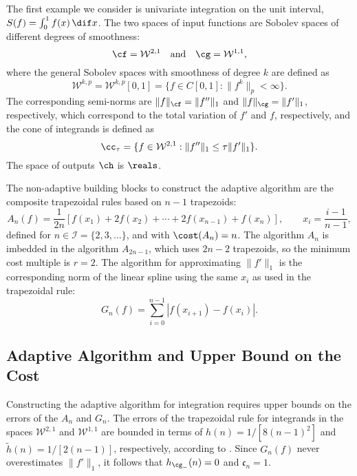 The first example we consider is univariate integration on the unit interval, $S(f)=\int_{0}^{1}f(x) \, \dif x$.  The two spaces of input functions are Sobolev spaces of different degrees of smoothness:
\begin{equation*}
  \cf=\mathcal{W}^{2,1} \quad \text{and} \quad
  \cg=\mathcal{W}^{1,1},
\end{equation*}
where the general Sobolev spaces with smoothness of degree $k$ are defined as 
\begin{equation} \label{defSobolev}
  \mathcal{W}^{k,p}=\mathcal{W}^{k,p}[0,1]=\{f\in C[0,1]: \|f^{k}\|_{p}<\infty\}.
\end{equation}
The corresponding semi-norms are $\|f\|_{\cf}=\|f''\|_{1}$ and $\|f\|_{\cg}=\|f'\|_{1}$, respectively, which correspond to the total variation of $f'$ and $f$, respectively,  and the cone of integrands is defined as  
\begin{equation}\label{coneinteg}
\cc_{\tau}=\{f\in \mathcal{W}^{2,1}:\|f''\|_1\leq\tau\|f'\|_1\}.
\end{equation}
The space of outputs $\ch$ is $\reals$.

The non-adaptive building blocks to construct the adaptive algorithm are the composite trapezoidal rules based on $n-1$ trapezoids:
\begin{equation*}
    A_{n}(f)
    =\frac{1}{2n}[f(x_1)+2f(x_2)+\cdots+2f(x_{n-1})+f(x_n)], \qquad x_i=\frac{i-1}{n-1},
\end{equation*}
defined for $n \in \mathcal{I}=\{2,3,\ldots\}$, and with $\cost(A_n)=n$.  The algorithm $A_n$ is imbedded in the algorithm $A_{2n-1}$, which uses $2n-2$ trapezoids, so the minimum cost multiple is $r=2$.  
The algorithm for approximating $\|f'\|_{1}$ is the corresponding norm of the linear spline using the same $x_i$ as used in the trapezoidal rule:
\begin{equation}\label{1direst}
    G_n(f)=\sum_{i=0}^{n-1}\left|f(x_{i+1})-f(x_{i})\right|.
\end{equation} 

\subsection{Adaptive Algorithm and Upper Bound on the Cost}

Constructing the adaptive algorithm for integration requires upper bounds on the errors of the $A_n$ and $G_n$.  The errors of the trapezoidal rule for integrands in the spaces $\mathcal{W}^{2,1}$ and $\mathcal{W}^{1,1}$ are bounded in terms of $h(n)=1/[8(n-1)^2]$ and $\tilde{h}(n)=1/[2(n-1)]$, respectively, according to \cite[(7.14) and (7.15)]{BraPet11a}.  Since $G_{n}(f)$ never overestimates $\|f'\|_{1}$, it follows that $h_{\cg_{-}}(n)=0$ and $\mathfrak{c}_n=1$. 

